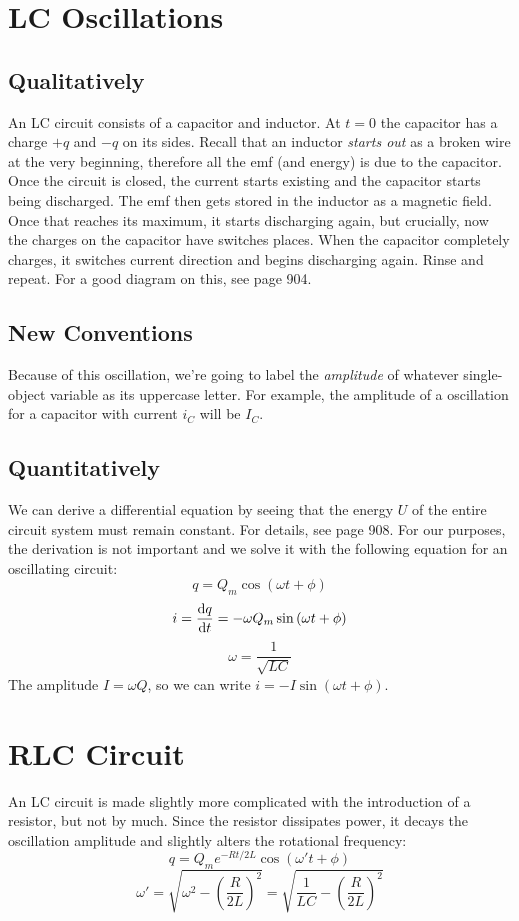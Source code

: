 \documentclass[]{article}
\begin{document}
\section{LC Oscillations}
\subsection{Qualitatively}
An LC circuit consists of a capacitor and inductor. At $ t = 0 $ the capacitor has a charge $ +q $ and $ -q $ on its sides. Recall that an inductor \emph{starts out} as a broken wire at the very beginning, therefore all the emf (and energy) is due to the capacitor. Once the circuit is closed, the current starts existing and the capacitor starts being discharged. The emf then gets stored in the inductor as a magnetic field. Once that reaches its maximum, it starts discharging again, but crucially, now the charges on the capacitor have switches places. When the capacitor completely charges, it switches current direction and begins discharging again. Rinse and repeat. For a good diagram on this, see page 904.

\subsection{New Conventions}
Because of this oscillation, we're going to label the \emph{amplitude} of whatever single-object variable as its uppercase letter. For example, the amplitude of a oscillation for a capacitor with current $ i_C $ will be $ I_C $.

\subsection{Quantitatively}
We can derive a differential equation by seeing that the energy $ U $ of the entire circuit system must remain constant. For details, see page 908. For our purposes, the derivation is not important and we solve it with the following equation for an oscillating circuit:
\[ q = Q_m\cos\left(\omega t + \phi\right) \]
\[ i = \dv{q}{t} = - \omega Q_m \sin\left(\omega t + \phi\right) \]
\[ \omega = \frac{1}{\sqrt{LC}} \]
The amplitude $ I = \omega Q $, so we can write $ i = -I \sin\left(\omega t + \phi\right) $.

\section{RLC Circuit}
An LC circuit is made slightly more complicated with the introduction of a resistor, but not by much. Since the resistor dissipates power, it decays the oscillation amplitude and slightly alters the rotational frequency:
\[ q = Q_m e^{-Rt/2L} \cos\left(\omega ' t + \phi\right) \]
\[ \omega' = \sqrt{\omega^2 - \left(\frac{R}{2L}\right)^2} = \sqrt{\frac{1}{LC} - \left(\frac{R}{2L}\right)^2} \]
\end{document}
